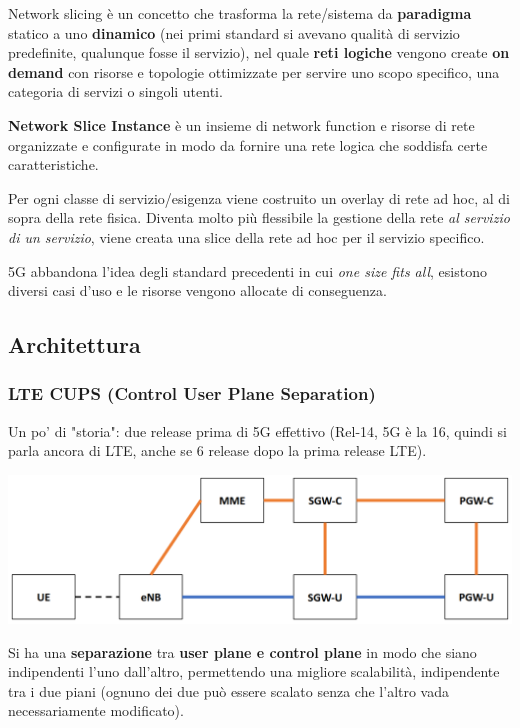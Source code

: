 Network slicing è un concetto che trasforma la rete/sistema  da \textbf{paradigma} statico a uno \textbf{dinamico} (nei primi standard si avevano qualità di servizio predefinite, qualunque fosse il servizio), nel quale \textbf{reti logiche} vengono create \textbf{on demand} con risorse e topologie ottimizzate per servire uno scopo specifico, una categoria di servizi o singoli utenti.

\textbf{Network Slice Instance} è un insieme di network function e risorse di rete organizzate e configurate in modo da fornire una rete logica che soddisfa certe caratteristiche.

Per ogni classe di servizio/esigenza viene costruito un overlay di rete ad hoc, al di sopra della rete fisica. Diventa molto più flessibile la gestione della rete \textit{al servizio di un servizio}, viene creata una slice della rete ad hoc per il servizio specifico.

5G abbandona l'idea degli standard precedenti in cui \textit{one size fits all}, esistono diversi casi d'uso e le risorse vengono allocate di conseguenza.


\subsection{Architettura}

\subsubsection{LTE CUPS (Control User Plane Separation)}

Un po' di "storia": due release prima di 5G effettivo (Rel-14, 5G è la 16, quindi si parla ancora di LTE, anche se 6 release dopo la prima release LTE). 
\begin{center}
	\includegraphics[width=0.9\linewidth]{img/5g/ltecups}
\end{center}

Si ha una \textbf{separazione} tra \textbf{user plane e control plane} in modo che siano indipendenti l'uno dall'altro, permettendo una migliore scalabilità, indipendente tra i due piani (ognuno dei due può essere scalato senza che l'altro vada necessariamente modificato). 

